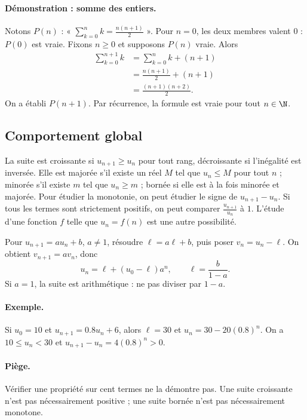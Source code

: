 \paragraph{Démonstration : somme des entiers.} Notons $P(n)$ : « $\sum_{k=0}^n k=\frac{n(n+1)}{2}$ ».
Pour $n=0$, les deux membres valent $0$ : $P(0)$ est vraie.
Fixons $n\ge0$ et supposons $P(n)$ vraie. Alors
\[\begin{aligned}\sum_{k=0}^{n+1}k&=\sum_{k=0}^nk+(n+1)\\&=\frac{n(n+1)}2+(n+1)\\&=\frac{(n+1)(n+2)}2.\end{aligned}\]
On a établi $P(n+1)$. Par récurrence, la formule est vraie pour tout $n\in\N$.
\subsection{Comportement global}
La suite est croissante si $u_{n+1}\ge u_n$ pour tout rang, décroissante si l'inégalité est inversée. Elle est majorée s'il existe un réel $M$ tel que $u_n\le M$ pour tout $n$ ; minorée s'il existe $m$ tel que $u_n\ge m$ ; bornée si elle est à la fois minorée et majorée.
Pour étudier la monotonie, on peut étudier le signe de $u_{n+1}-u_n$. Si tous les termes sont strictement positifs, on peut comparer $\frac{u_{n+1}}{u_n}$ à $1$. L'étude d'une fonction $f$ telle que $u_n=f(n)$ est une autre possibilité.
\begin{method}
Pour $u_{n+1}=au_n+b$, $a\ne1$, résoudre $\ell=a\ell+b$, puis poser $v_n=u_n-\ell$. On obtient $v_{n+1}=av_n$, donc
\[u_n=\ell+(u_0-\ell)a^n,\qquad\ell=\frac{b}{1-a}.\]
Si $a=1$, la suite est arithmétique : ne pas diviser par $1-a$.
\end{method}
\paragraph{Exemple.} Si $u_0=10$ et $u_{n+1}=\num{0,8}u_n+6$, alors $\ell=30$ et $u_n=30-20(\num{0,8})^n$. On a $10\le u_n<30$ et $u_{n+1}-u_n=4(\num{0,8})^n>0$.
\paragraph{Piège.} Vérifier une propriété sur cent termes ne la démontre pas. Une suite croissante n'est pas nécessairement positive ; une suite bornée n'est pas nécessairement monotone.


\mxnewpage
